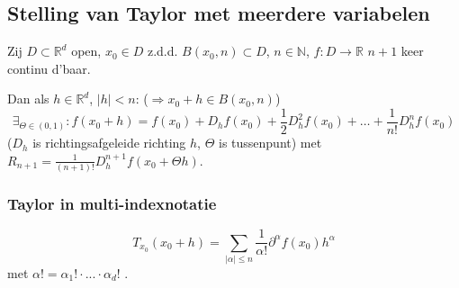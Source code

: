 \documentclass[a4paper]{exam}
\theoremstyle{definition}
\newcommand{\naturals}{\mathbb{N}}
\newcommand{\reals}{\mathbb{R}}
\begin{document}
		\subsection{Stelling van Taylor met meerdere variabelen}
			\theorem Zij  $D \subset \reals^d$ open, $x_0 \in D$ z.d.d. $B(x_0,n) \subset D$, $n\in \naturals$, $f:D\to \reals$ $n+1$ keer continu d'baar.
			
			Dan als $h \in \reals^d$, $ |h|<n $: ($\Rightarrow x_0+h \in B(x_0,n)$)
			\[ \exists_{\Theta \in (0,1)}:f(x_0+h) = f(x_0) + D_h f(x_0) + \frac{1}{2} D_h^2 f(x_0) + \dots + \frac{1}{n!} D_h^n f(x_0) \]
			($D_h$ is richtingsafgeleide richting $h$, $\Theta$ is tussenpunt)
			met $R_{n+1} = \frac{1}{(n+1)!}D_h^{n+1} f(x_0 + \Theta h)$.
		
		\subsubsection{Taylor in multi-indexnotatie}
			\[ T_{x_0} (x_0 + h) = \sum_{|\alpha|\le n} \frac{1}{\alpha !} \partial^\alpha f(x_0)h^\alpha \] met $ \alpha ! = \alpha_1 ! \cdot ... \cdot \alpha_d !$ .
			
		
		
\end{document}
